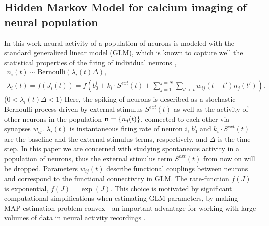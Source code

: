 \documentclass[amsmath,amssymb]{revtex4}
\begin{document}
\subsection{\label{sec:methods:markov-setup}Hidden Markov Model for calcium imaging of neural population}
In this work neural activity of a population of neurons is modeled with the standard generalized linear model (GLM), which is known to capture well the statistical properties of the firing of individual neurons \cite{PILL07,PAN03d,Wu07,Rigat06,OKA05},
\begin{equation}\label{eqn:glm:definition}
\begin{array}{l}
n_i(t)\sim \text{Bernoulli}(\lambda_i(t)\Delta), \\
\lambda_i(t)=f(J_i(t))=f(b_0^i+k_i\cdot S^{ext}(t)+\sum\limits_{j=1}^{j=N} \sum\limits_{t'<t} w_{ij}(t-t')n_{j}(t')).
\end{array}
\end{equation}
($ 0 < \lambda_i(t)\Delta<1$)
Here, the spiking of neurons is described as a stochastic Bernoulli process driven by external stimulus $S^{ext}(t)$ as well as the activity of other neurons in the population ${\bf n}=\{n_{j}(t)\}$, connected to each other via synapses $w_{ij}$.
$\lambda_i(t)$ is instantaneous firing rate of neuron $i$, $b_0^i$ and $k_i\cdot S^{ext}(t)$ are the baseline and the external stimulus terms, respectively, and $\Delta$ is the time step.
In this paper we are concerned with studying spontaneous activity in a population of neurons, thus the external stimulus term $S^{ext}(t)$ from now on will be dropped.
Parameters $w_{ij}(t)$ describe functional couplings between neurons and correspond to the functional connectivity in GLM.
The rate-function $f(J)$ is exponential, $f(J)=\exp(J)$. 
This choice is motivated by significant computational simplifications when estimating GLM parameters, 
by making MAP estimation problem convex - an important advantage for working with large volumes of data
in neural activity recordings \cite{PAN03d}.
\end{document}
